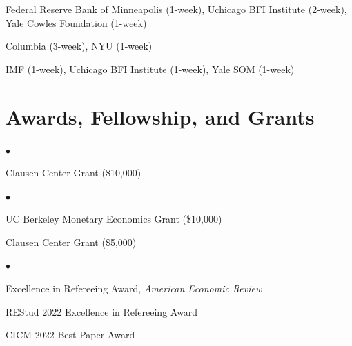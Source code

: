 \documentclass[line]{res}
\newenvironment{list1}{
  \begin{list}{\ding{113}}{%
      \setlength{\itemsep}{0.07in}
      \setlength{\parsep}{0in} \setlength{\parskip}{0in}
		\setlength{\topsep}{0.07in} \setlength{\partopsep}{0in} 
      \setlength{\leftmargin}{0.0in}}}{\end{list}}
\newenvironment{list2}{
  \begin{list}{$\bullet$}{%
      \setlength{\itemsep}{0in}
      \setlength{\parsep}{0in} \setlength{\parskip}{0in}
      \setlength{\topsep}{0in} \setlength{\partopsep}{0in} 
      \setlength{\leftmargin}{0in}}}{\end{list}}
\begin{document}
\begin{resume}
\begin{list1}
\item[2024] Federal Reserve Bank of Minneapolis (1-week), Uchicago BFI Institute (2-week), Yale Cowles Foundation (1-week)

\item[2023] Columbia (3-week), NYU (1-week)

\item[2022] IMF (1-week), Uchicago BFI Institute (1-week), Yale SOM (1-week)

\end{list1}

\section{\sc Awards, Fellowship, and Grants}
\begin{list1}
   \item[2024] 
   \begin{list2}
   \item[] Clausen Center Grant (\$10,000)
    \end{list2}
\end{list1}

\begin{list1}
   \item[2023] 
   \begin{list2}
   \item[] UC Berkeley Monetary Economics Grant (\$10,000)
   \vspace{0.2cm}
   \item[] Clausen Center Grant (\$5,000)
   \end{list2}

\end{list1}

\begin{list1}

\item[2022]

\begin{list2}
\item[] Excellence in Refereeing Award, \emph{American Economic Review}
\vspace{0.2cm}
\item[] REStud 2022 Excellence in Refereeing Award
\vspace{0.2cm}
\item[] CICM 2022 Best Paper Award

\end{list2}

\item[2021]


\end{list1}
\end{resume}
\end{document}
